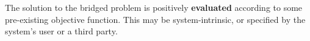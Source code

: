 



\begin{defn}\label{def:result}
\hypertarget{def:result}{}The solution to the bridged problem is positively 
\textbf{evaluated} according to some pre-existing objective function.
This may be system-intrinsic, or specified by the system's user or a third party.
\end{defn}

                                         
